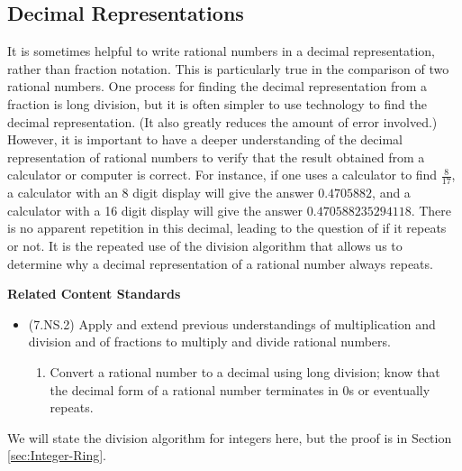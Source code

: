 \documentclass[
]{book}
\providecommand{\tightlist}{%
  \setlength{\itemsep}{0pt}\setlength{\parskip}{0pt}}
\newenvironment{standards}{}{}
\theoremstyle{definition}
\theoremstyle{definition}
\theoremstyle{definition}
\theoremstyle{definition}
\theoremstyle{remark}
\begin{document}
\hypertarget{decimal-representations}{%
\subsection{Decimal Representations}\label{decimal-representations}}

It is sometimes helpful to write rational numbers in a decimal representation, rather than fraction notation. This is particularly true in the comparison of two rational numbers. One process for finding the decimal representation from a fraction is long division, but it is often simpler to use technology to find the decimal representation. (It also greatly reduces the amount of error involved.) However, it is important to have a deeper understanding of the decimal representation of rational numbers to verify that the result obtained from a calculator or computer is correct. For instance, if one uses a calculator to find \(\frac{8}{17}\), a calculator with an 8 digit display will give the answer \(0.4705882\), and a calculator with a 16 digit display will give the answer \(0.470588235294118\). There is no apparent repetition in this decimal, leading to the question of if it repeats or not. It is the repeated use of the division algorithm that allows us to determine why a decimal representation of a rational number always repeats.

\begin{standards}

\begin{center}
\textbf{Related Content Standards}

\end{center}

\begin{itemize}
\tightlist
\item
  (7.NS.2) Apply and extend previous understandings of multiplication and division and of fractions to multiply and divide rational numbers.

  \begin{enumerate}
  \def\labelenumi{\alph{enumi}.}
  \setcounter{enumi}{3}
  \tightlist
  \item
    Convert a rational number to a decimal using long division; know that the decimal form of a rational number terminates in 0s or eventually repeats.
  \end{enumerate}
\end{itemize}

\end{standards}

We will state the division algorithm for integers here, but the proof is in Section \ref{sec:Integer-Ring}.
\end{document}

